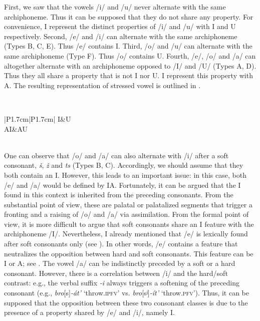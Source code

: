\documentclass[output=paper,
modfonts,
newtxmath,
hidelinks,
]{langscibook}
\begin{document}
First, we saw that the vowels /i/ and /u/ never alternate with the same archiphoneme. Thus it can be supposed that they do not share any property. For convenience, I represent the distinct properties of /i/ and /u/ with {\textbar}I{\textbar} and {\textbar}U{\textbar} respectively. Second, /e/ and /i/ can alternate with the same archiphoneme (Types B, C, E). Thus /e/ contains {\textbar}I{\textbar}. Third, /o/ and /u/ can alternate with the same archiphoneme (Type F). Thus /o/ contains {\textbar}U{\textbar}. Fourth, /e/, /o/ and /a/ can altogether alternate with an archiphoneme opposed to /I/ and /U/ (Types A, D). Thus they all share a property that is not {\textbar}I{\textbar} nor {\textbar}U{\textbar}. I represent this property with {\textbar}A{\textbar}. The resulting representation of stressed vowel is outlined in .

\label{5:19}\\\medskip
\begin{tabular}{|P{1.7cm}|P{1.7cm}|}
\hline
\textbar I\textbar&\textbar U\textbar\\\hline
\textbar AI\textbar&\textbar AU\textbar\\\hline
{}\\\hline
\end{tabular}
\z

\noindent One can observe that /o/ and /a/ can also alternate with /i/ after a soft consonant, \textit{š}, \textit{ž} and \textit{ts} (Types B, C). Accordingly, we should assume that they both contain an {\textbar}I{\textbar}. However, this leads to an important issue: in this case, both /e/ and /a/ would be defined by {\textbar}IA{\textbar}. Fortunately, it can be argued that the {\textbar}I{\textbar} found in this context is inherited from the preceding consonants. From the substantial point of view, these are palatal or palatalized segments that trigger a fronting and a raising of /o/ and /a/ via assimilation. From the formal point of view, it is more difficult to argue that soft consonants share an {\textbar}I{\textbar} feature with the archiphoneme /I/. Nevertheless, I already mentioned that /e/ is lexically found after soft consonants only (see ). In other words, /e/ contains a feature that neutralizes the opposition between hard and soft consonants. This feature can be {\textbar}I{\textbar} or {\textbar}A{\textbar}; see . The vowel /a/ can be indistinctly preceded by a soft or a hard consonant. However, there is a correlation between /i/ and the hard/soft contrast: e.g., the verbal suffix \textit{-i} always triggers a softening of the preceding consonant (e.g., \textit{bro}[s]\textit{{}-}\textit{át’} `throw.\textsc{ipfv}' vs. \textit{bro}[sʲ]\textit{{}-}\textit{ít’} ‘throw.\textsc{pfv}’). Thus, it can be supposed that the opposition between these two consonant classes is due to the presence of a property shared by /e/ and /i/, namely {\textbar}I{\textbar}.
\end{document}
